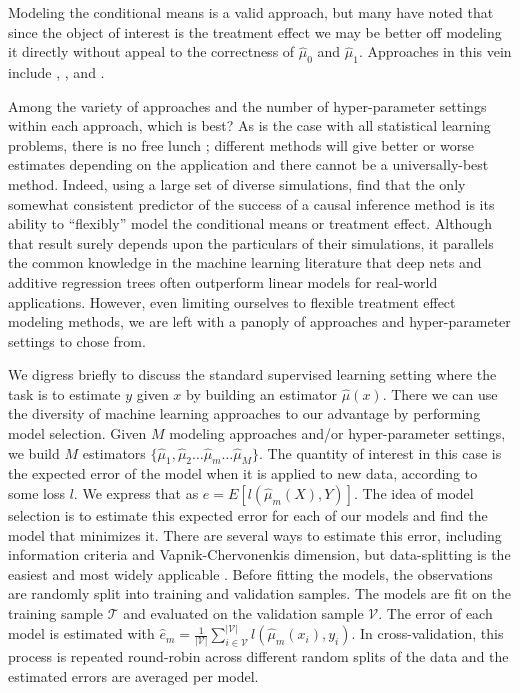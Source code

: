 Modeling the conditional means is a valid approach, but many have noted that since the object of interest is the treatment effect we may be better off modeling it directly without appeal to the correctness of $\hat\mu_0$ and $\hat\mu_1$. Approaches in this vein include \citet{Zhao:2017vi}, \citet{Athey:2016wm}, and \citet{Powers:2017wd}. 

Among the variety of approaches and the number of hyper-parameter settings within each approach, which is best? As is the case with all statistical learning problems, there is no free lunch \cite{Wolpert:1996fp}; different methods will give better or worse estimates depending on the application and there cannot be a universally-best method. Indeed, using a large set of diverse simulations, \citet{Dorie:2017uo} find that the only somewhat consistent predictor of the success of a causal inference method is its ability to ``flexibly'' model the conditional means or treatment effect. Although that result surely depends upon the particulars of their simulations, it parallels the common knowledge in the machine learning literature that deep nets and additive regression trees often outperform linear models for real-world applications. However, even limiting ourselves to flexible treatment effect modeling methods, we are left with a panoply of approaches and hyper-parameter settings to chose from. 

We digress briefly to discuss the standard supervised learning setting where the task is to estimate $y$ given $x$ by building an estimator $\hat{\mu}(x)$. There we can use the diversity of machine learning approaches to our advantage by performing model selection. Given $M$ modeling approaches and/or hyper-parameter settings, we build $M$ estimators $\{\hat \mu_1, \hat \mu_2 \dots \hat \mu_m \dots \hat \mu_M\}$. The quantity of interest in this case is the expected error of the model when it is applied to new data, according to some loss $l$. We express that as $e = E[l(\hat \mu_m(X), Y)]$. The idea of model selection is to estimate this expected error for each of our models and find the model that minimizes it. There are several ways to estimate this error, including information criteria and Vapnik-Chervonenkis dimension, but data-splitting is the easiest and most widely applicable \cite{esl:2009wc}. Before fitting the models, the observations are randomly split into training and validation samples. The models are fit on the training sample $\mathcal{T}$ and evaluated on the validation sample $\mathcal{V}$. The error of each model is estimated with $\hat e_m = \frac{1}{|\mathcal{V}|}\sum_{i \in \mathcal{V}}^{|\mathcal{V}|} l(\hat \mu_m (x_i), y_i)$. In cross-validation, this process is repeated round-robin across different random splits of the data and the estimated errors are averaged per model.

